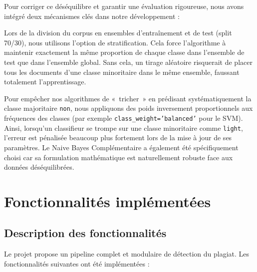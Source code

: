 \documentclass[12pt,a4paper]{article}
\begin{document}
Pour corriger ce déséquilibre et garantir une évaluation rigoureuse, nous avons intégré deux mécanismes clés dans notre développement :

\begin{description}[style=nextline, leftmargin=1.5cm]
    \item[Échantillonnage stratifié (\texttt{stratify})]
    Lors de la division du corpus en ensembles d'entraînement et de test (split 70/30), nous utilisons l'option de stratification. Cela force l'algorithme à maintenir exactement la même proportion de chaque classe dans l'ensemble de test que dans l'ensemble global. Sans cela, un tirage aléatoire risquerait de placer tous les documents d'une classe minoritaire dans le même ensemble, faussant totalement l'apprentissage.

    \item[Pondération des classes (\texttt{class\_weight})]
    Pour empêcher nos algorithmes de «~tricher~» en prédisant systématiquement la classe majoritaire \texttt{non}, nous appliquons des poids inversement proportionnels aux fréquences des classes (par exemple \texttt{class\_weight='balanced'} pour le SVM). Ainsi, lorsqu'un classifieur se trompe sur une classe minoritaire comme \texttt{light}, l'erreur est pénalisée beaucoup plus fortement lors de la mise à jour de ses paramètres. Le Naive Bayes Complémentaire a également été spécifiquement choisi car sa formulation mathématique est naturellement robuste face aux données déséquilibrées.
\end{description}

\section{Fonctionnalités implémentées}

\subsection{Description des fonctionnalités}

Le projet propose un pipeline complet et modulaire de détection du plagiat. Les fonctionnalités suivantes ont été implémentées :
\end{document}
